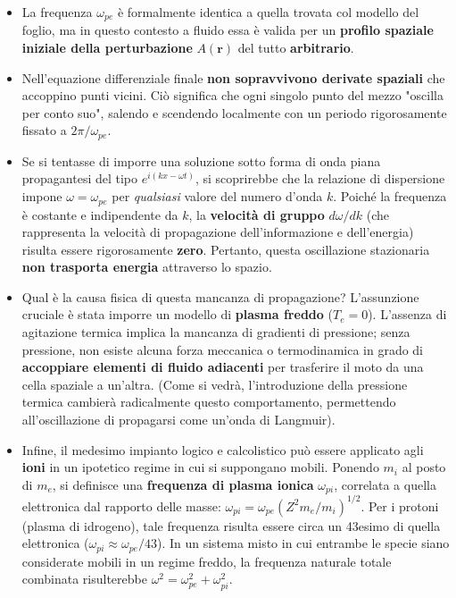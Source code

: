 \begin{itemize}
\item La frequenza $\omega_{pe}$ è formalmente identica a quella trovata col modello del foglio, ma in questo contesto a fluido essa è valida per un \textbf{profilo spaziale iniziale della perturbazione} $A(\mathbf{r})$ del tutto \textbf{arbitrario}.
\item Nell'equazione differenziale finale \textbf{non sopravvivono derivate spaziali} che accoppino punti vicini. Ciò significa che ogni singolo punto del mezzo "oscilla per conto suo", salendo e scendendo localmente con un periodo rigorosamente fissato a $2\pi/\omega_{pe}$.
\item Se si tentasse di imporre una soluzione sotto forma di onda piana propagantesi del tipo $e^{i(kx - \omega t)}$, si scoprirebbe che la relazione di dispersione impone $\omega = \omega_{pe}$ per \textit{qualsiasi} valore del numero d'onda $k$. Poiché la frequenza è costante e indipendente da $k$, la \textbf{velocità di gruppo} $d\omega/dk$ (che rappresenta la velocità di propagazione dell'informazione e dell'energia) risulta essere rigorosamente \textbf{zero}. Pertanto, questa oscillazione stazionaria \textbf{non trasporta energia} attraverso lo spazio.
\item Qual è la causa fisica di questa mancanza di propagazione? L'assunzione cruciale è stata imporre un modello di \textbf{plasma freddo} ($T_e = 0$). L'assenza di agitazione termica implica la mancanza di gradienti di pressione; senza pressione, non esiste alcuna forza meccanica o termodinamica in grado di \textbf{accoppiare elementi di fluido adiacenti} per trasferire il moto da una cella spaziale a un'altra. (Come si vedrà, l'introduzione della pressione termica cambierà radicalmente questo comportamento, permettendo all'oscillazione di propagarsi come un'onda di Langmuir).
\item Infine, il medesimo impianto logico e calcolistico può essere applicato agli \textbf{ioni} in un ipotetico regime in cui si suppongano mobili. Ponendo $m_i$ al posto di $m_e$, si definisce una \textbf{frequenza di plasma ionica} $\omega_{pi}$, correlata a quella elettronica dal rapporto delle masse: $\omega_{pi} = \omega_{pe}(Z^2 m_e / m_i)^{1/2}$. Per i protoni (plasma di idrogeno), tale frequenza risulta essere circa un 43esimo di quella elettronica ($\omega_{pi} \approx \omega_{pe}/43$). In un sistema misto in cui entrambe le specie siano considerate mobili in un regime freddo, la frequenza naturale totale combinata risulterebbe $\omega^2 = \omega_{pe}^2 + \omega_{pi}^2$.
\end{itemize}

